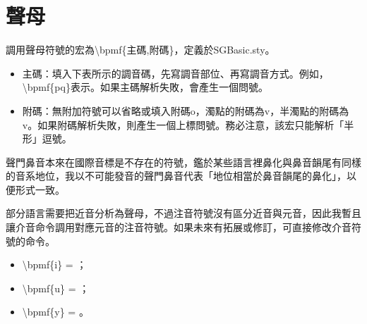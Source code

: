 \section{聲母}
調用聲母符號的宏為{\textbackslash}bpmf\{主碼,附碼\}，定義於SGBasic.sty。\par
\begin{itemize}
	\item 主碼：填入下表所示的調音碼，先寫調音部位、再寫調音方式。例如，{\textbackslash}bpmf\{pq\}表示。如果主碼解析失敗，會產生一個問號。
	\item 附碼：無附加符號可以省略或填入附碼o，濁點的附碼為v，半濁點的附碼為v。如果附碼解析失敗，則產生一個上標問號。務必注意，該宏只能解析「半形」逗號。
\end{itemize}
聲門鼻音本來在國際音標是不存在的符號，鑑於某些語言裡鼻化與鼻音韻尾有同樣的音系地位，我以不可能發音的聲門鼻音代表「地位相當於鼻音韻尾的鼻化」，以便形式一致。\par
{}
部分語言需要把近音分析為聲母，不過注音符號沒有區分近音與元音，因此我暫且讓介音命令調用對應元音的注音符號。如果未來有拓展或修訂，可直接修改介音符號的命令。\par
\begin{itemize}
	\item {\textbackslash}bpmf\{i\} = ；
	\item {\textbackslash}bpmf\{u\} = ；
	\item {\textbackslash}bpmf\{y\} = 。
\end{itemize}

\clearpage